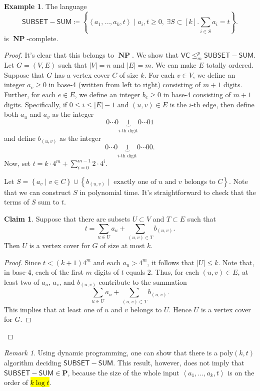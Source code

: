\documentclass[10pt,letterpaper,cm]{nupset}
\theoremstyle{definition}
\newtheorem{exmp}[definition]{Example}
\theoremstyle{theorem}
\newtheorem*{claim}{Claim}
\theoremstyle{remark}
\newtheorem{remark}[definition]{Remark}
\newcommand{\1}{\mathbf{1}}
\newcommand{\0}{\vec 0}
\DeclareMathOperator{\NP}{\mathbf{NP}}
\begin{document}
\begin{exmp}
The language  $$\mathsf{SUBSET{-}SUM} \coloneqq \left\{\left\langle a_1, \ldots, a_k, t\right\rangle \mid a_i,t\geq 0,\ \exists S \subset [k].\sum_{i\in S} a_i = t\right\}.$$ is $\NP$-complete.
\end{exmp}
\begin{proof}
It's clear that this belongs to $\NP$. We show that $\mathsf{VC} \leq_m^p \mathsf{SUBSET{-}SUM}$. Let $G=\left(V, E\right)$ such that $\left\lvert{V}\right\rvert = n$ and $\left\lvert{E}\right\rvert= m$. We can make $E$ totally ordered. Suppose that $G$ has a vertex cover $C$ of size $k$. For each $v\in V$, we define an integer $a_v\geq 0$ in base-4 (written from left to right) consisting of $m+1$ digits. Further, for each $e\in E$, we define an integer $b_e\geq 0$ in base-4 consisting of $m+1$ digits. Specifically, if $0\leq i \leq \left\lvert{E}\right\rvert-1$ and  $\left(u,v\right) \in E$ is the $i$-th edge, then define both $a_u$ and $a_v$  as the integer $$0 \cdots 0 \underbrace{1}_{i\text{-th digit}} 0 \cdots 01   $$ and define $b_{(u,v)}$ as the integer $$0 \cdots 0 \underbrace{1}_{i\text{-th digit}} 0 \cdots 00     .$$ Now, set $t= k \cdot 4^m + \sum_{i=0}^{m-1}2 \cdot 4^i$.

\medskip

 Let $S = \left\{a_v \mid v\in C\right\} \cup \left\{b_{(u,v)} \mid\text{ exactly one of }u\text{ and }v\text{ belongs to }C\right\}$. Note that we can construct $S$ in polynomial time. It's straightforward to check that the terms of $S$ sum to $t$. 
\begin{claim}
Suppose that there are subsets $U\subset V$ and $T\subset E$ such that $$t= \sum_{u\in U}a_u +\sum_{(u,v) \in T} b_{(u,v)}.$$ Then $U$ is a vertex cover for $G$ of size at most $k$.
\end{claim}
\begin{proof}
Since $t<(k+1)4^m$ and each $a_u> 4^m$, it follows that $\left\lvert{U}\right\rvert\leq k$. Note that, in base-4, each of the first $m$ digits of $t$ equals $2$. Thus, for each $\left(u,v\right) \in E$, at least two of $a_u$, $a_v$, and $b_{(u,v)}$ contribute to the summation $$\sum_{u\in U}a_u +\sum_{(u,v) \in T} b_{(u,v)}.$$ This implies that at least one of $u$ and $v$ belongs to $U$. Hence $U$ is a vertex cover for $G$.
\end{proof}
\end{proof}

\begin{remark}
Using dynamic programming, one can show that there is a poly$\left(k, t\right)$ algorithm deciding $\mathsf{SUBSET{-}SUM}$. This result, however, does not imply that $\mathsf{SUBSET{-}SUM} \in \mathbf{P}$, because the size of the whole input $\left\langle a_1, \ldots, a_k, t\right\rangle$ is on the order of \hl{$k\log{t}$}.
\end{remark}
\end{document}
